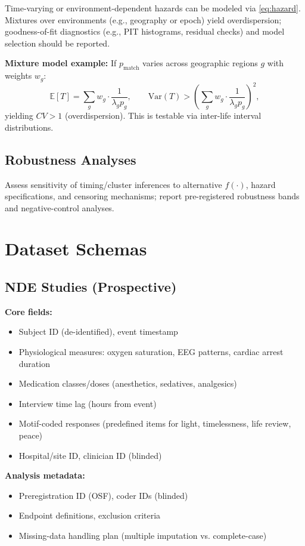 \documentclass[11pt,letterpaper]{article}
\theoremstyle{definition}
\theoremstyle{remark}
\begin{document}
Time-varying or environment-dependent hazards can be modeled via \eqref{eq:hazard}. Mixtures over environments (e.g., geography or epoch) yield overdispersion; goodness-of-fit diagnostics (e.g., PIT histograms, residual checks) and model selection should be reported.

\textbf{Mixture model example:} If \(p_{\text{match}}\) varies across geographic regions \(g\) with weights \(w_g\):
\[
\mathbb{E}[T] = \sum_g w_g \cdot \frac{1}{\lambda_g p_g},\qquad \mathrm{Var}(T) > \left(\sum_g w_g \cdot \frac{1}{\lambda_g p_g}\right)^2,
\]
yielding \(CV > 1\) (overdispersion). This is testable via inter-life interval distributions.

\subsection{Robustness Analyses}

Assess sensitivity of timing/cluster inferences to alternative \(f(\cdot)\), hazard specifications, and censoring mechanisms; report pre-registered robustness bands and negative-control analyses.

\section{Dataset Schemas}\label{app:schemas}

\subsection{NDE Studies (Prospective)}

\textbf{Core fields:}
\begin{itemize}
  \item Subject ID (de-identified), event timestamp
  \item Physiological measures: oxygen saturation, EEG patterns, cardiac arrest duration
  \item Medication classes/doses (anesthetics, sedatives, analgesics)
  \item Interview time lag (hours from event)
  \item Motif-coded responses (predefined items for light, timelessness, life review, peace)
  \item Hospital/site ID, clinician ID (blinded)
\end{itemize}

\textbf{Analysis metadata:}
\begin{itemize}
  \item Preregistration ID (OSF), coder IDs (blinded)
  \item Endpoint definitions, exclusion criteria
  \item Missing-data handling plan (multiple imputation vs. complete-case)
\end{itemize}
\end{document}
